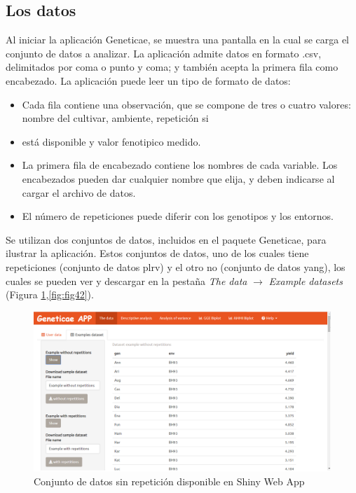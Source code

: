 \subsection{Los datos}
Al iniciar la aplicación Geneticae, se muestra una pantalla en la cual se carga el conjunto de datos a analizar. La aplicación admite datos en formato .csv, delimitados por coma o punto y coma; y también acepta la primera fila como encabezado. La aplicación puede leer un tipo de formato de datos: 
\begin{itemize}
\item Cada fila contiene una observación, que se compone de tres o cuatro valores: nombre del cultivar, ambiente, repetición si \item está disponible y valor fenotipico medido.
\item La primera fila de encabezado contiene los nombres de cada variable. Los encabezados pueden dar cualquier nombre que elija, y deben indicarse al cargar el archivo de datos.
\item El número de repeticiones puede diferir con los genotipos y los entornos.
\end{itemize}

Se utilizan dos conjuntos de datos, incluidos en el paquete Geneticae, para ilustrar la aplicación. Estos conjuntos de datos, uno de los cuales tiene repeticiones (conjunto de datos plrv) y el otro no (conjunto de datos yang), los cuales se pueden ver y descargar en la pestaña \emph{The data} $\rightarrow$ \emph{Example datasets} (Figura \ref{fig:fig41},\ref{fig:fig42}). 

\begin{figure}[H]
	\begin{center}
		\includegraphics[width=17cm]{./Graficos/Exampledatasets_withoutrep.png}
	\end{center}
	\caption{Conjunto de datos sin repetición disponible en Shiny Web App}
	\label{fig:fig41}
\end{figure}



